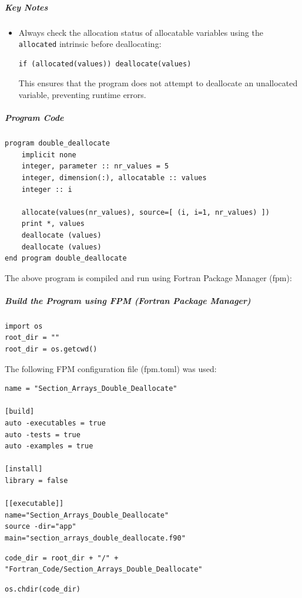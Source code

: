 \subparagraph{Key Notes}

\begin{itemize}
\item Always check the allocation status of allocatable variables using the \texttt{allocated} intrinsic before deallocating:

\begin{verbatim}
if (allocated(values)) deallocate(values)
\end{verbatim}

This ensures that the program does not attempt to deallocate an unallocated variable, preventing runtime errors.
\end{itemize}

\subparagraph{Program Code}

\begin{verbatim}
program double_deallocate
    implicit none
    integer, parameter :: nr_values = 5
    integer, dimension(:), allocatable :: values
    integer :: i

    allocate(values(nr_values), source=[ (i, i=1, nr_values) ])
    print *, values
    deallocate (values)
    deallocate (values)
end program double_deallocate
\end{verbatim}

The above program is compiled and run using Fortran Package Manager (fpm):

\subparagraph{Build the Program using FPM (Fortran Package Manager)}

\begin{verbatim}
import os
root_dir = ""
root_dir = os.getcwd()
\end{verbatim}

The following FPM configuration file (fpm.toml) was used:

\begin{verbatim}
name = "Section_Arrays_Double_Deallocate"

[build]
auto -executables = true
auto -tests = true
auto -examples = true

[install]
library = false

[[executable]]
name="Section_Arrays_Double_Deallocate"
source -dir="app"
main="section_arrays_double_deallocate.f90"
\end{verbatim}

\begin{verbatim}
code_dir = root_dir + "/" + "Fortran_Code/Section_Arrays_Double_Deallocate"
\end{verbatim}

\begin{verbatim}
os.chdir(code_dir)
\end{verbatim}

